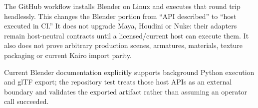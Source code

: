The GitHub workflow  installs Blender on Linux and executes that round trip headlessly. This changes the Blender portion from ``API described'' to ``host executed in CI.'' It does not upgrade Maya, Houdini or Nuke: their adapters remain host-neutral contracts until a licensed/current host can execute them. It also does not prove arbitrary production scenes, armatures, materials, texture packaging or current Kairo import parity.

Current Blender documentation explicitly supports background Python execution and glTF export; the repository test treats those host APIs as an external boundary and validates the exported artifact rather than assuming an operator call succeeded.
